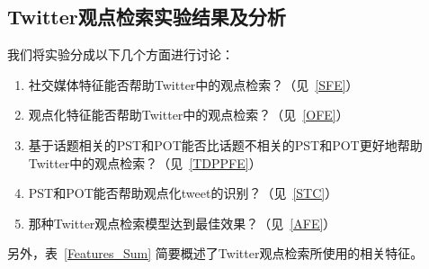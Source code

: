\subsection{Twitter观点检索实验结果及分析}
我们将实验分成以下几个方面进行讨论：

\begin{enumerate}
\item 社交媒体特征能否帮助Twitter中的观点检索？（{见~\ref{SFE}}）
\item 观点化特征能否帮助Twitter中的观点检索？（{见~\ref{OFE}}）
\item 基于话题相关的PST和POT能否比话题不相关的PST和POT更好地帮助Twitter中的观点检索？（见~\ref{TDPPFE}）
\item  PST和POT能否帮助观点化tweet的识别？（{见~\ref{STC}}）
\item 那种Twitter观点检索模型达到最佳效果？（{见~\ref{AFE}}）
\end{enumerate}

另外，表~\ref{Features_Sum} 简要概述了Twitter观点检索所使用的相关特征。

